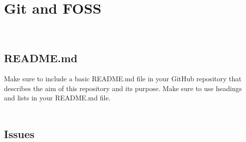 \documentclass[a4paper,12pt]{article}
\begin{document}
\section{Git and FOSS}
\\
\subsection{README.md}
Make sure to include a basic README.md file in your GitHub repository that describes
the aim of this repository and its purpose.
Make sure to use headings and lists in your README.md file.
\\
\\
\subsection{Issues}
\end{document}
